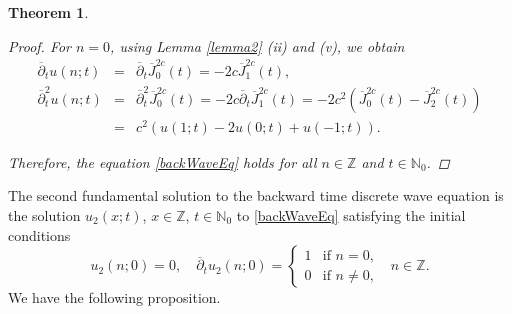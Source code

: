 \documentclass[12pt]{amsart}
\numberwithin{equation}{section}
\newtheorem{theorem}{Theorem}[section]
\begin{document}
\begin{theorem}
\begin{proof}
For $n=0$, using Lemma \ref{lemma2} (ii) and (v), we obtain%
\begin{eqnarray*}
\overline{\partial }_{t}u\left( n;t\right) &=&\overline{\partial }_{t}%
\overline{J}_{0}^{2c}\left( t\right) =-2c\overline{J}_{1}^{2c}\left(
t\right) , \\
\overline{\partial }_{t}^{2}u\left( n;t\right) &=&\overline{\partial }%
_{t}^{2}\overline{J}_{0}^{2c}\left( t\right) =-2c\overline{\partial }_{t}%
\overline{J}_{1}^{2c}\left( t\right) =-2c^{2}\left( \overline{J}%
_{0}^{2c}\left( t\right) -\overline{J}_{2}^{2c}\left( t\right) \right) \\
&=&c^{2}\left( u\left( 1;t\right) -2u\left( 0;t\right) +u\left( -1;t\right)
\right) .
\end{eqnarray*}

Therefore, the equation \eqref{backWaveEq} holds for all $n\in \mathbb{Z}$
and $t\in \mathbb{N}_{0}$.
\end{proof}
\end{theorem}

The second fundamental solution to the backward time discrete wave equation is the solution $u_2(x;t)$, $x\in\mathbb{Z}$, $t\in\mathbb{N}_0$ to \eqref{backWaveEq} satisfying the initial conditions
\begin{equation}\label{eq. init cond u2}
u_{2}\left( n;0\right) =0,\quad \overline{\partial }_{t}u_2\left( n;0\right)
=\left\{
\begin{array}{ll}
1 & \text{if }n=0, \\
0 & \text{if }n\neq 0,%
\end{array}%
\right. \text{ \ }n\in \mathbb{Z}.
\end{equation}
We have the following proposition.
\end{document}
